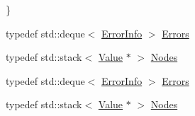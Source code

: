 \begin{DoxyCompactItemize}
 \}
\item 
typedef std\+::deque$<$ \hyperlink{class_json_1_1_reader_1_1_error_info}{Error\+Info} $>$ \hyperlink{class_json_1_1_reader_aae51e8f5bab3f067261c842a3ef858e5}{Errors}
\item 
typedef std\+::stack$<$ \hyperlink{class_json_1_1_value}{Value} $\ast$ $>$ \hyperlink{class_json_1_1_reader_a8da2114fe8b8124d41ea2f3434f0171b}{Nodes}
\item 
typedef std\+::deque$<$ \hyperlink{class_json_1_1_reader_1_1_error_info}{Error\+Info} $>$ \hyperlink{class_json_1_1_reader_aae51e8f5bab3f067261c842a3ef858e5}{Errors}
\item 
typedef std\+::stack$<$ \hyperlink{class_json_1_1_value}{Value} $\ast$ $>$ \hyperlink{class_json_1_1_reader_a8da2114fe8b8124d41ea2f3434f0171b}{Nodes}
\end{DoxyCompactItemize}
